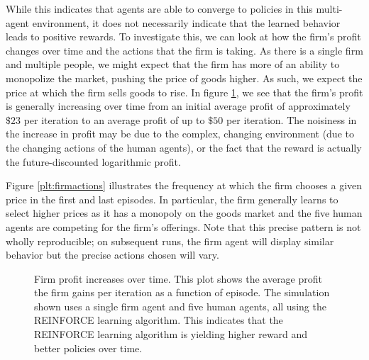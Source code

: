 \documentclass[twoside,twocolumn]{article}
\begin{document}
While this indicates that agents are able to converge to policies in this multi-agent environment, it does not necessarily indicate that the learned behavior leads to positive rewards. To investigate this, we can look at how the firm's profit changes over time and the actions that the firm is taking. As there is a single firm and multiple people, we might expect that the firm has more of an ability to monopolize the market, pushing the price of goods higher. As such, we expect the price at which the firm sells goods to rise. In figure \ref{plt:firmprofitincrease}, we see that the firm's profit is generally increasing over time from an initial average profit of approximately $\$23$ per iteration to an average profit of up to $\$50$ per iteration. The noisiness in the increase in profit may be due to the complex, changing environment (due to the changing actions of the human agents), or the fact that the reward is actually the future-discounted logarithmic profit.

\medskip 

Figure \ref{plt:firmactions} illustrates the frequency at which the firm chooses a given price in the first and last episodes. In particular, the firm generally learns to select higher prices as it has a monopoly on the goods market and the five human agents are competing for the firm's offerings. Note that this precise pattern is not wholly reproducible; on subsequent runs, the firm agent will display similar behavior but the precise actions chosen will vary.  

\begin{figure}[h]
  \caption{Firm profit increases over time. This plot shows the average profit the firm gains per iteration as a function of episode. The simulation shown uses a single firm agent and five human agents, all using the REINFORCE learning algorithm. This indicates that the REINFORCE learning algorithm is yielding higher reward and better policies over time.}
  \label{plt:firmprofitincrease}
  \end{figure}
\end{document}
